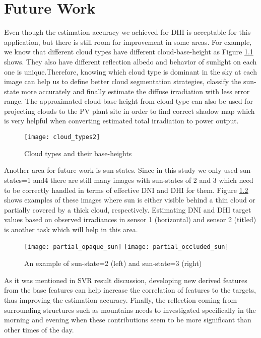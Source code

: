 \chapter{Future Work}
\label{sec:future_work_chapter}
Even though the estimation accuracy we achieved for DHI is acceptable for this application, but there is still room for improvement in some areas. For example, 
we know that different cloud types have different cloud-base-height as Figure \ref{fig:cloud_type} shows. They also have different reflection albedo and behavior of sunlight on each one is unique.Therefore, knowing which cloud type is dominant in the sky at each image can help us to define better cloud segmentation strategies, classify the sun-state more accurately and finally estimate the diffuse irradiation with less error range. The approximated cloud-base-height from cloud type can also be used for projecting clouds to the PV plant site in order to find correct shadow map which is very helpful when converting estimated total irradiation to power output.

\begin{figure}[h!]
\caption{Cloud types and their base-heights}
\label{fig:cloud_type}
\texttt{[image: cloud\_types2]}
\centering
\end{figure}

Another area for future work is sun-states. Since in this study we only used sun-states=1 and4 there are still many images with sun-states of 2 and 3 which need to be correctly handled in terms of effective DNI and DHI for them. Figure \ref{fig:img_state_2} shows examples of these images where sun is either visible behind a thin cloud or partially covered by a thick cloud, respectively. Estimating DNI and DHI target values based on observed irradiances in sensor 1 (horizontal) and sensor 2 (titled) is another task which will help in this area.

\begin{figure}[h!]
\caption{An example of sun-state=2 (left) and sun-state=3 (right)}
\label{fig:img_state_2}
\texttt{[image: partial\_opaque\_sun]}
\texttt{[image: partial\_occluded\_sun]}
\centering
\end{figure}

As it was mentioned in SVR result discussion, developing new derived features from the base features can help increase the correlation of features to the targets, thus improving the estimation accuracy. Finally, the reflection coming from surrounding structures such as mountains needs to investigated specifically in the morning and evening when these contributions seem to be more significant than other times of the day.